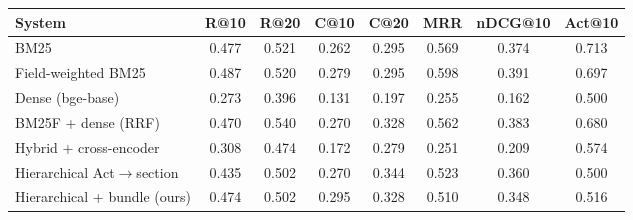 \begin{tabular}{lccccccc}
\toprule
System & R@10 & R@20 & C@10 & C@20 & MRR & nDCG@10 & Act@10 \\
\midrule
BM25 & 0.477 & 0.521 & 0.262 & 0.295 & 0.569 & 0.374 & 0.713 \\
Field-weighted BM25 & 0.487 & 0.520 & 0.279 & 0.295 & 0.598 & 0.391 & 0.697 \\
Dense (bge-base) & 0.273 & 0.396 & 0.131 & 0.197 & 0.255 & 0.162 & 0.500 \\
BM25F + dense (RRF) & 0.470 & 0.540 & 0.270 & 0.328 & 0.562 & 0.383 & 0.680 \\
Hybrid + cross-encoder & 0.308 & 0.474 & 0.172 & 0.279 & 0.251 & 0.209 & 0.574 \\
Hierarchical Act$\rightarrow$section & 0.435 & 0.502 & 0.270 & 0.344 & 0.523 & 0.360 & 0.500 \\
Hierarchical + bundle (ours) & 0.474 & 0.502 & 0.295 & 0.328 & 0.510 & 0.348 & 0.516 \\
\bottomrule
\end{tabular}
